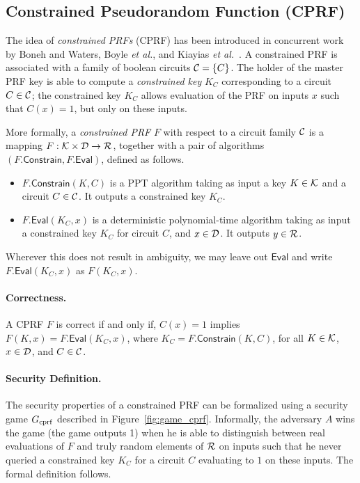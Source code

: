 


\subsection{Constrained Pseudorandom Function (CPRF)} %
\label{sub:def_cprf}

The idea of \emph{constrained PRFs} (CPRF) has been introduced in concurrent work by Boneh and Waters, Boyle \emph{et al.}, and Kiayias \emph{et al.}~\cite{AC:BonWat13,PKC:BoyGolIva14,CCS:KPTZ13}.
A constrained PRF is associated with a family of boolean circuits $\mathcal{C} = \{C\}$.
The holder of the master PRF key is able to compute a \emph{constrained key} $K_C$ corresponding to a circuit $C \in \mathcal{C}$; the constrained key $K_C$ allows evaluation of the PRF on inputs $x$ such that $C(x) = 1$, but only on these inputs.

More formally, a \emph{constrained PRF} $F$  with respect to a circuit family $\mathcal{C}$ is a mapping $F: \mathcal{K} \times \mathcal{D} \rightarrow \mathcal{R}$, together with a pair of algorithms $(F.\mathsf{Constrain}, F.\mathsf{Eval})$, defined as follows.
\begin{itemize}
	\item $F.\mathsf{Constrain}(K,C)$ is a PPT algorithm taking as input a key $K \in \mathcal{K}$ and a circuit $C \in \mathcal{C}$. It outputs a constrained key $K_C$.
	
	\item $F.\mathsf{Eval}(K_C,x)$ is a deterministic polynomial-time algorithm taking as input a constrained key $K_C$ for circuit $C$, and $x \in \mathcal{D}$. It outputs $y \in \mathcal{R}$.
\end{itemize}

Wherever this does not result in ambiguity, we may leave out $\mathsf{Eval}$ and write $F.\mathsf{Eval}(K_C,x)$ as $F(K_C,x)$.

\paragraph*{Correctness.} %
A CPRF $F$ is correct if and only if, $C(x) = 1$ implies $F(K,x) = F.\mathsf{Eval}(K_C,x)$, where $K_C = F.\mathsf{Constrain}(K,C)$, for all $K \in \mathcal{K}$, $x \in \mathcal{D}$, and $C \in \mathcal{C}$.

\paragraph*{Security Definition.} %
\label{par:cprf_security}
The security properties of a constrained PRF can be formalized using a security game $G_{\mathrm{cprf}}$ described in Figure~\ref{fig:game_cprf}.
Informally, the adversary $A$ wins the game (the game outputs 1) when he is able to distinguish between real evaluations of $F$ and truly random elements of $\mathcal{R}$ on inputs such that he never queried a constrained key $K_C$ for a circuit $C$ evaluating to $1$ on these inputs. 
The formal definition follows.

